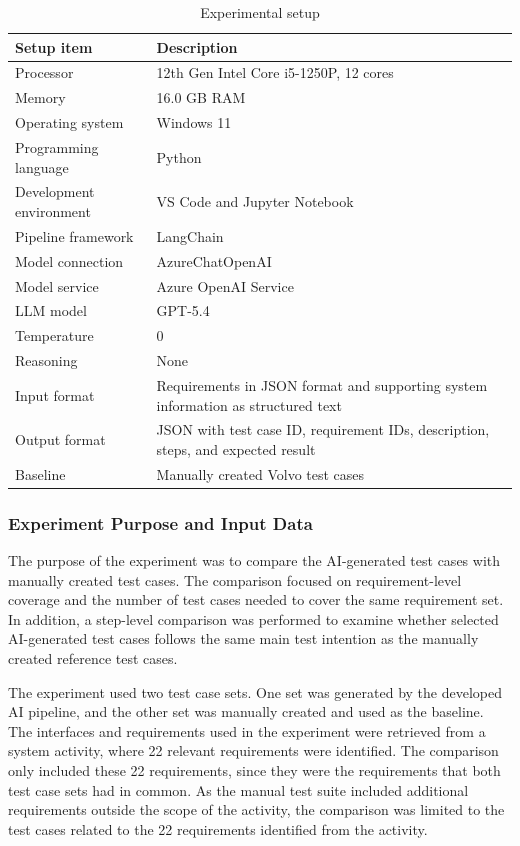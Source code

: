 \documentclass[a4paper,12pt]{article}
\begin{document}
\begin{table}[H]
\centering
\caption{Experimental setup}
\label{tab:experimental_setup}
\begin{tabular}{p{4cm} p{9cm}}
\toprule
\textbf{Setup item} & \textbf{Description} \\
\midrule
Processor & 12th Gen Intel Core i5-1250P, 12 cores \\
Memory & 16.0 GB RAM \\
Operating system & Windows 11 \\
Programming language & Python \\
Development environment & VS Code and Jupyter Notebook \\
Pipeline framework & LangChain \\
Model connection & AzureChatOpenAI \\
Model service & Azure OpenAI Service \\
LLM model & GPT-5.4 \\
Temperature & 0 \\
Reasoning & None \\
Input format & Requirements in JSON format and supporting system information as structured text \\
Output format & JSON with test case ID, requirement IDs, description, steps, and expected result \\
Baseline & Manually created Volvo test cases \\
\bottomrule
\end{tabular}
\end{table}

\subsubsection{Experiment Purpose and Input Data}
The purpose of the experiment was to compare the AI-generated test cases with manually created test cases. The comparison focused on requirement-level coverage and the number of test cases needed to cover the same requirement set. In addition, a step-level comparison was performed to examine whether selected AI-generated test cases follows the same main test intention as the manually created reference test cases. 

The experiment used two test case sets. One set was generated by the developed AI pipeline, and the other set was manually created and used as the baseline. The interfaces and requirements used in the experiment were retrieved from a system activity, where 22 relevant requirements were identified. The comparison only included these 22 requirements, since they were the requirements that both test case sets had in common. As the manual test suite included additional requirements outside the scope of the activity, the comparison was limited to the test cases related to the 22 requirements identified from the activity.
\end{document}
